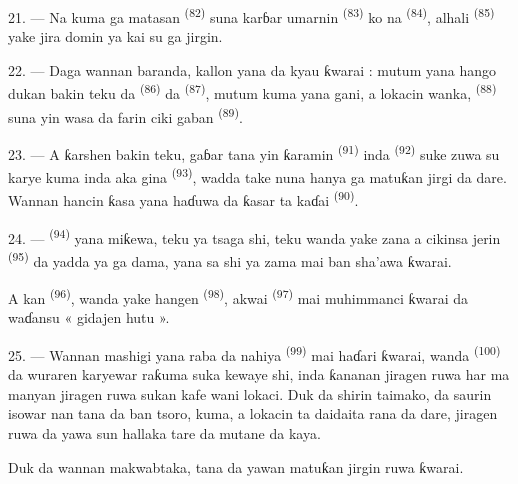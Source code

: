21. --- Na kuma ga matasan 
\textsuperscript{(82)} suna karɓar umarnin 
\textsuperscript{(83)} ko na  \textsuperscript{(84)},
alhali  \textsuperscript{(85)} yake jira domin
ya kai su ga jirgin.

22. --- Daga wannan baranda, kallon yana da kyau ƙwarai : mutum yana
hango dukan bakin teku da  \textsuperscript{(86)} da
 \textsuperscript{(87)}, mutum kuma yana gani,
a lokacin wanka,  \textsuperscript{(88)} suna yin wasa
da farin ciki gaban  \textsuperscript{(89)}.

23. --- A ƙarshen bakin teku, gaɓar tana yin ƙaramin  \textsuperscript{(91)}  inda  \textsuperscript{(92)} suke zuwa su karye kuma inda aka gina
 \textsuperscript{(93)}, wadda take nuna hanya ga
matuƙan jirgi da dare. Wannan hancin ƙasa yana haɗuwa da ƙasar ta
 kaɗai \textsuperscript{(90)}.

\VUsaut{3.0mm}
\VUsaut{3.0mm}

24. ---  \textsuperscript{(94)} yana miƙewa, teku
ya tsaga shi, teku wanda yake zana a cikinsa jerin 
\textsuperscript{(95)} da  yadda ya ga dama, yana sa
shi ya zama mai ban sha’awa ƙwarai.

A kan  \textsuperscript{(96)}, wanda yake hangen
 \textsuperscript{(98)}, akwai 
\textsuperscript{(97)} mai muhimmanci ƙwarai da waɗansu « gidajen
hutu ».

25. --- Wannan mashigi yana raba da nahiya 
\textsuperscript{(99)} mai haɗari ƙwarai, wanda 
\textsuperscript{(100)} da wuraren karyewar raƙuma suka kewaye shi, inda
ƙananan jiragen ruwa har ma manyan jiragen ruwa sukan kafe wani lokaci.
Duk da shirin taimako, da saurin isowar 
 nan tana da ban tsoro, kuma, a lokacin
 ta daidaita rana da dare, jiragen ruwa da yawa sun hallaka
tare da mutane da kaya.

Duk da wannan makwabtaka,  tana da yawan
matuƙan jirgin ruwa ƙwarai.

\VUsaut{6.0mm}
\VUfilet{22mm}
